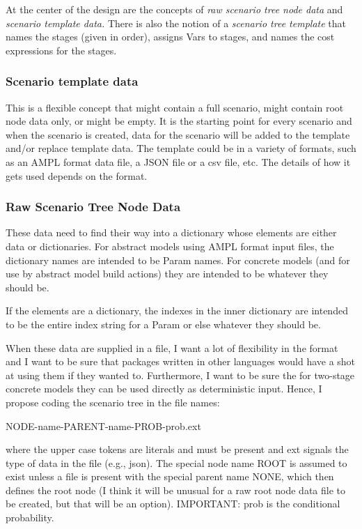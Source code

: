 \documentclass[12pt]{article}
\begin{document}
At the center of the design are the concepts of {\em raw scenario tree
  node data} and {\em scenario template data.} There is also the
notion of a {\em scenario tree template} that names the stages (given
in order), assigns Vars to stages, and names the cost expressions for
the stages.

\subsubsection{Scenario template data}

This is a flexible concept that might contain a full scenario, might
contain root node data only, or might be empty. It is the starting
point for every scenario and when the scenario is created, data for
the scenario will be added to the template and/or replace template
data. The template could be in a variety of formats, such as an AMPL
format data file, a JSON file or a csv file, etc. The details of how
it gets used depends on the format.

\subsubsection{Raw Scenario Tree Node Data}

These data need to find their way into a dictionary whose elements are
either data or dictionaries. For abstract models using AMPL format
input files, the dictionary names are intended to be Param names. For
concrete models (and for use by abstract model build actions) they are
intended to be whatever they should be.

If the elements are a dictionary, the indexes in the inner dictionary
are intended to be the entire index string for a Param or else
whatever they should be.

When these data are supplied in a file, I want a lot of flexibility
in the format and I want to be sure that packages written in other
languages would have a shot at using them if they wanted to. Furthermore,
I want to be sure the for two-stage concrete models they
can be used directly as deterministic input. Hence,
I propose coding the scenario tree in the file names:

NODE-name-PARENT-name-PROB-prob.ext

where the upper case tokens are literals and must be present and ext
signals the type of data in the file (e.g., json). The special node name
ROOT is assumed to exist unless a file is present with the special
parent name NONE, which then defines the root node (I think
it will be unusual for a raw root node data file to be created, but
that will be an option). IMPORTANT: prob is the conditional probability.
\end{document}
